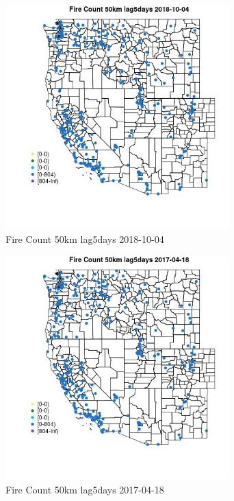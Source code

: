 \begin{figure} 
\centering  
\includegraphics[width=0.77\textwidth]{Code_Outputs/Report_ML_input_PM25_Step4_part_f_de_duplicated_aves_prioritize_24hr_obswNAs_MapObsFire_Count_50km_lag5days2018-10-04.jpg} 
\caption{\label{fig:Report_ML_input_PM25_Step4_part_f_de_duplicated_aves_prioritize_24hr_obswNAsMapObsFire_Count_50km_lag5days2018-10-04}Fire Count 50km lag5days 2018-10-04} 
\end{figure} 
 

\begin{figure} 
\centering  
\includegraphics[width=0.77\textwidth]{Code_Outputs/Report_ML_input_PM25_Step4_part_f_de_duplicated_aves_prioritize_24hr_obswNAs_MapObsFire_Count_50km_lag5days2017-04-18.jpg} 
\caption{\label{fig:Report_ML_input_PM25_Step4_part_f_de_duplicated_aves_prioritize_24hr_obswNAsMapObsFire_Count_50km_lag5days2017-04-18}Fire Count 50km lag5days 2017-04-18} 
\end{figure} 
 

